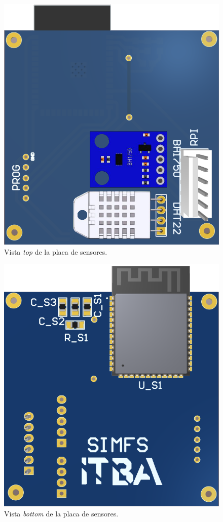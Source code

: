 \begin{figure}[H]
	\centering
	\includegraphics[width=0.75\linewidth,page=1]{ImagenesIngenieria de Detalle/sensores_top}		
	\caption{Vista \textit{top} de la placa de sensores.}
	\label{fig:sensores_top}
\end{figure}

\begin{figure}[H]
	\centering
	\includegraphics[width=0.75\linewidth,page=1]{ImagenesIngenieria de Detalle/sensores_bot}		
	\caption{Vista \textit{bottom} de la placa de sensores.}
	\label{fig:sensores_bottom}
\end{figure}

